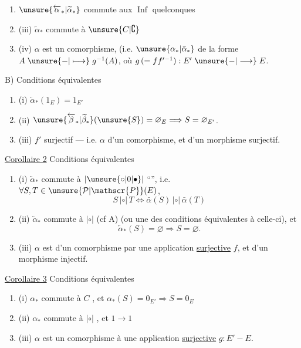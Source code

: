 
\begin{enumerate}[label={},leftmargin=1.8em]
\item {} $\unsure{\overleftarrow{\alpha}_*|\widetilde{\alpha}_*}$ commute aux $\operatorname{Inf}$ quelconques
\item (iii) $\overleftarrow{\alpha}_*$ commute à $\unsure{C|\complement}$
\item (iv) $\alpha$ est un comorphisme,  (i.e. $\unsure{\alpha_*|\bar\alpha_*}$ de la forme $A\mathrel{\unsure{-|\longmapsto}}g^{-1}(A)$, où $g\,(=f f'^{-1}):E'\mathrel{\unsure{-|\longrightarrow}}E$.
\end{enumerate}

B) Conditions équivalentes
\begin{enumerate}[label={},leftmargin=1.8em]
\item (i) $\overleftarrow{\alpha}_*(1_E)=1_{E'}$
\item (ii) $\unsure{\overleftarrow{\beta}_*|\widetilde{\beta}_*}(\unsure{S})=\varnothing_E\Longrightarrow S=\varnothing_{E'}$.
\item (iii) $f'$ surjectif --- i.e. $\alpha$  d'un comorphisme, et d'un morphisme surjectif.
\end{enumerate}

\uline{Corollaire 2} Conditions équivalentes
\begin{enumerate}[label={},leftmargin=1.8em]
\item (i) $\overleftarrow{\alpha}_*$ commute à $|\unsure{\circ|0|\bullet}|$ ``'', i.e. $\forall S,T\in\unsure{\mathcal{P}|\mathscr{P}}(E)$,
\[
S\,|\circ|\,T\Longleftrightarrow\bar\alpha(S)\,|\circ|\,\bar\alpha(T)
\]
\item (ii) $\overleftarrow{\alpha}_*$ commute à $|\circ|$ (cf A) (ou une des conditions équivalentes à celle-ci), et
\[
\overleftarrow{\alpha}_*(S)=\varnothing\Longrightarrow S=\varnothing.
\]
\item (iii) $\alpha$ est  d'un comorphisme  par une application \uline{surjective} $f$, et d'un morphisme injectif.
\end{enumerate}

\uline{Corollaire 3} Conditions équivalentes
\begin{enumerate}[label={},leftmargin=1.8em]
\item (i) $\alpha_*$ commute à $C$ , et $\alpha_*(S)=0_{E'}\Rightarrow S=0_E$
\item (ii) $\alpha_*$ commute à $|\circ|$ , et $1\to1$
\item (iii) $\alpha$ est un comorphisme  à une application \uline{surjective} $g:E'\mathrel{-}E$.
\end{enumerate}

